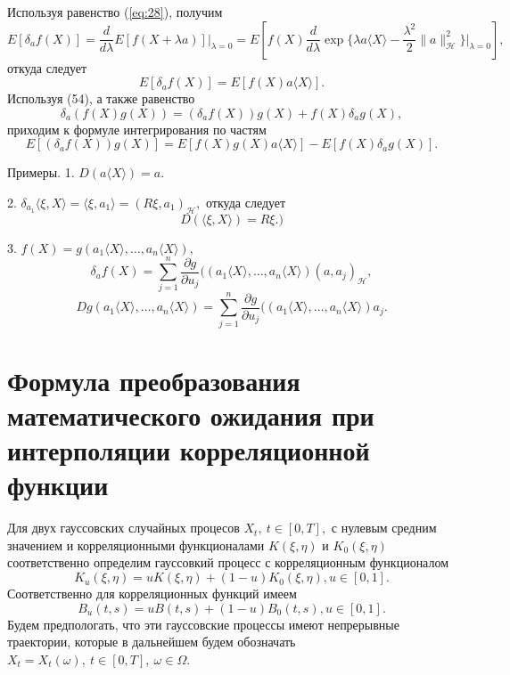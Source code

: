\documentclass [a4paper, 12pt]{report}
\begin{document}
Используя равенство (\ref{eq:28}), получим
$$E[\delta_a f(X)]=
 \frac{d}{d\lambda}E[f(X+\lambda a)]\Big|_{\lambda=0}=
 E[f(X)\frac{d}{d\lambda}
 \exp\Big\{\lambda a\langle X\rangle-
 \frac{\lambda^2}{2}\|a\|^2_{\mathcal{H}}\Big\}\Big|_{\lambda=0}],$$
откуда следует
\begin{equation}\label{eq:32}
E[\delta_a f(X)]=E[f(X)a\langle X\rangle].
\end{equation}
Используя (54), а также равенство
\begin{equation}\label{eq:33}
\delta_a(f(X)g(X))=(\delta_a f(X))g(X)+f(X)\delta_a g(X),
\end{equation}
приходим к формуле интегрирования по частям
\begin{equation}\label{eq:34}
E[(\delta_a f(X))g(X)]= E[f(X)g(X)a\langle X\rangle]-E[f(X)\delta_a g(X)].
\end{equation}

Примеры. 1. $D(a\langle X\rangle)=a.$

2. $\delta_{a_1}\langle\xi,X\rangle=\langle\xi,a_1\rangle=
(R\xi,a_1)_\mathcal{H},$
откуда следует
\begin{equation}\label{eq:35}
D(\langle\xi,X\rangle)=R\xi.)
\end{equation}

3. $f(X)=g(a_1\langle X\rangle,\ldots,a_n\langle X\rangle),$
$$
\delta_a f(X)=\sum\limits_{j=1}^n \frac{\partial g}{\partial u_j}
((a_1\langle X\rangle,\ldots,a_n\langle X\rangle)(a,a_j)_\mathcal{H},
$$
$$
Dg(a_1\langle X\rangle,\ldots,a_n\langle X\rangle)=
\sum\limits_{j=1}^n \frac{\partial g}{\partial u_j}
((a_1\langle X\rangle,\ldots,a_n\langle X\rangle)a_j.
$$

\newpage

\chapter{Формула преобразования математического ожидания при интерполяции корреляционной функции}

Для двух гауссовских случайных процесов $X_t,~ t\in[0, T],$
с нулевым средним значением и корреляционными функционалами $K(\xi,\eta)$ и $K_0(\xi,\eta)$ соответственно
определим гауссовкий процесс с корреляционным функционалом
$$
K_u(\xi,\eta)= uK(\xi,\eta)+ (1 - u)K_0(\xi,\eta), u \in [0, 1].
$$
Соответственно для корреляционных функций имеем
$$
B_u(t,s)= uB(t,s)+ (1 - u)B_0(t,s), u \in [0, 1].
$$
Будем предпологать, что эти гауссовские процессы имеют непрерывные траектории,
которые в дальнейшем будем обозначать $X_t = X_t(\omega),~ t \in [0, T],~ \omega \in \Omega.$\
\end{document}
